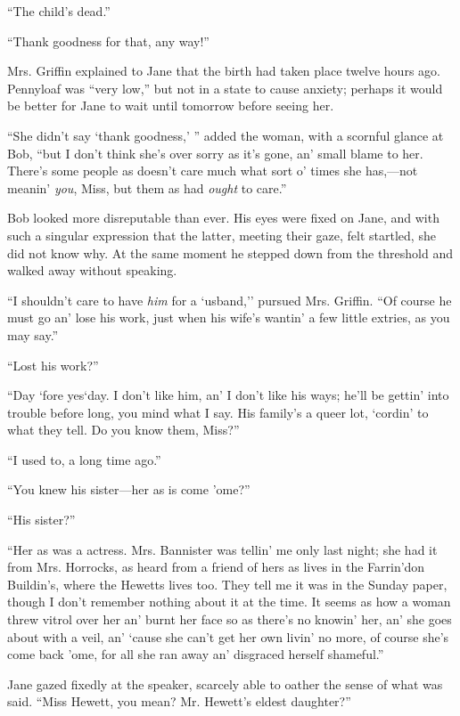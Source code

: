 ``The child's dead.''

``Thank goodness for that, any way!''

Mrs. Griffin explained to Jane that the birth had taken place twelve
hours ago. Pennyloaf was ``very low,'' but not in a state to cause
anxiety; perhaps it would be better for Jane to wait until tomorrow
before seeing her.

``She didn't say `thank goodness,' '' added the woman, with a scornful
glance at Bob, ``but I don't think she's over sorry as it's gone, an'
small blame to her. There's some people as doesn't care much what sort
o' times she has,---not meanin' \emph{you}, Miss, but them as had
\emph{ought} to care.''

Bob looked more disreputable than ever. His eyes were fixed on Jane, and
with such a singular expression that the latter, meeting
{\protect\hypertarget{146}{}{}}their gaze, felt startled, she did not
know why. At the same moment he stepped down from the threshold and
walked away without speaking.

``I shouldn't care to have \emph{him} for a `usband,'' pursued Mrs.
Griffin. ``Of course he must go an' lose his work, just when his wife's
wantin' a few little extries, as you may say.''

``Lost his work?''

``Day `fore yes`day. I don't like him, an' I don't like his ways; he'll
be gettin' into trouble before long, you mind what I say. His family's a
queer lot, `cordin' to what they tell. Do you know them, Miss?''

``I used to, a long time ago.''

``You knew his sister---her as is come 'ome?''

``His sister?''

``Her as was a actress. Mrs. Bannister was tellin' me only last night;
she had it from Mrs. Horrocks, as heard from a friend of hers as lives
in the Farrin'don Buildin's, where the Hewetts lives too. They tell me
it was in the Sunday paper, though I don't remember nothing about it at
the time. It seems as how a woman threw vitrol over her an' burnt her
face so as there's no knowin' her, an' she goes about with a veil, an'
`cause she can't get her {\protect\hypertarget{147}{}{}}own livin' no
more, of course she's come back 'ome, for all she ran away an' disgraced
herself shameful.''

Jane gazed fixedly at the speaker, scarcely able to oather the sense of
what was said. ``Miss Hewett, you mean? Mr. Hewett's eldest daughter?''

